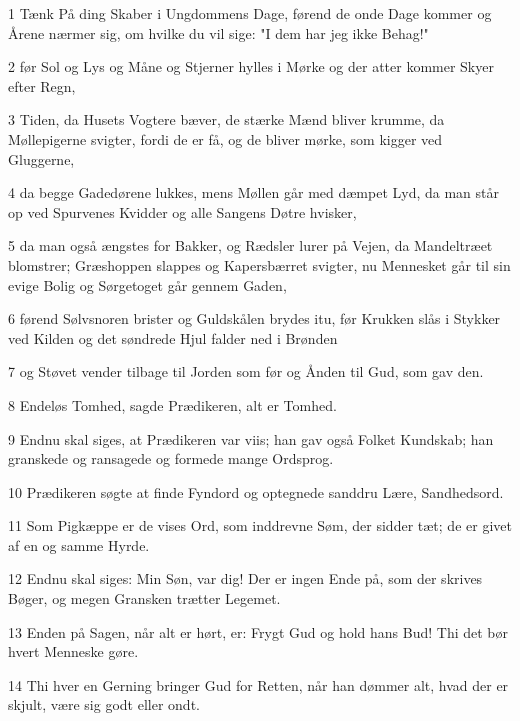 \par 1 Tænk På ding Skaber i Ungdommens Dage, førend de onde Dage kommer og Årene nærmer sig, om hvilke du vil sige: "I dem har jeg ikke Behag!"
\par 2 før Sol og Lys og Måne og Stjerner hylles i Mørke og der atter kommer Skyer efter Regn,
\par 3 Tiden, da Husets Vogtere bæver, de stærke Mænd bliver krumme, da Møllepigerne svigter, fordi de er få, og de bliver mørke, som kigger ved Gluggerne,
\par 4 da begge Gadedørene lukkes, mens Møllen går med dæmpet Lyd, da man står op ved Spurvenes Kvidder og alle Sangens Døtre hvisker,
\par 5 da man også ængstes for Bakker, og Rædsler lurer på Vejen, da Mandeltræet blomstrer; Græshoppen slappes og Kapersbærret svigter, nu Mennesket går til sin evige Bolig og Sørgetoget går gennem Gaden,
\par 6 førend Sølvsnoren brister og Guldskålen brydes itu, før Krukken slås i Stykker ved Kilden og det søndrede Hjul falder ned i Brønden
\par 7 og Støvet vender tilbage til Jorden som før og Ånden til Gud, som gav den.
\par 8 Endeløs Tomhed, sagde Prædikeren, alt er Tomhed.
\par 9 Endnu skal siges, at Prædikeren var viis; han gav også Folket Kundskab; han granskede og ransagede og formede mange Ordsprog.
\par 10 Prædikeren søgte at finde Fyndord og optegnede sanddru Lære, Sandhedsord.
\par 11 Som Pigkæppe er de vises Ord, som inddrevne Søm, der sidder tæt; de er givet af en og samme Hyrde.
\par 12 Endnu skal siges: Min Søn, var dig! Der er ingen Ende på, som der skrives Bøger, og megen Gransken trætter Legemet.
\par 13 Enden på Sagen, når alt er hørt, er: Frygt Gud og hold hans Bud! Thi det bør hvert Menneske gøre.
\par 14 Thi hver en Gerning bringer Gud for Retten, når han dømmer alt, hvad der er skjult, være sig godt eller ondt.


